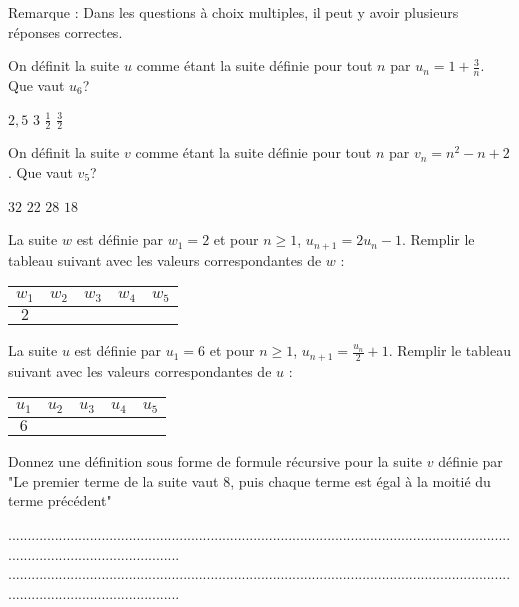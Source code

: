 \documentclass[10pt,a4paper]{exam}
\begin{document}
Remarque : Dans les questions à choix multiples, il peut y avoir plusieurs réponses correctes.


On définit la suite $u$ comme étant la suite définie pour tout $n$ par $u_n = 1 + \frac{3}{n}$. Que vaut $u_6$? \newline
\begin{oneparcheckboxes}
   \choice $2,5$
   \choice $3$
   \choice $\frac{1}{2}$
   \choice $\frac{3}{2}$
\end{oneparcheckboxes}

 
On définit la suite $v$ comme étant la suite définie pour tout $n$ par $v_n = n^2 - n +  2$. Que vaut $v_5$? \newline
\begin{oneparcheckboxes}
   \choice $32$
   \choice $22$
   \choice $28$
   \choice $18$
\end{oneparcheckboxes}
 


La suite $w$ est définie par $w_1=2$  et pour $n\geq 1$, $u_{n+1} = 2u_n -1$. Remplir le tableau suivant avec les valeurs correspondantes de $w$ :
\begin{center}
    \begin{tabular}{|c|c|c|c|c|}
       \hline
       $w_1$ & $w_2$ & $w_3$ & $w_4$ & $w_5$ \\
       \hline
       $2$ &   &  & & \\
       \hline
    \end{tabular}
\end{center}




La suite $u$ est définie par $u_1=6$  et pour $n\geq 1$, $u_{n+1} = \frac{u_n}{2} +1$. Remplir le tableau suivant avec les valeurs correspondantes de $u$ :

\begin{center}
\begin{tabular}{|c|c|c|c|c|}
   \hline
   $u_1$ & $u_2$ & $u_3$ & $u_4$ & $u_5$ \\
   \hline
   $6$ &   &  & & \\
   \hline
\end{tabular}
\end{center}



Donnez une définition sous forme de formule récursive pour la suite $v$ définie par  "Le premier terme de la suite vaut 8, puis chaque terme est égal à la moitié du terme précédent"


.............................................................................................................................................................................\newline
.............................................................................................................................................................................
 
\end{document}
